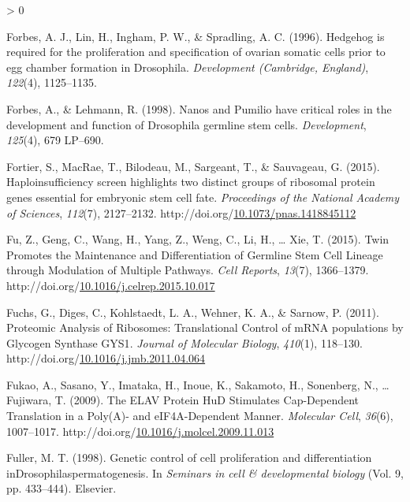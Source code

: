 \documentclass[12pt,oneside]{reedthesis}
\newlength{\cslhangindent}
\newenvironment{CSLReferences}[2] %
 {%
  \setlength{\parindent}{0pt}
  \ifodd #1 \everypar{\setlength{\hangindent}{\cslhangindent}}\ignorespaces\fi
  \ifnum #2 > 0
  \setlength{\parskip}{#2\baselineskip}
  \fi
 }%
 {}
\begin{document}
\begin{CSLReferences}{1}{0}
\leavevmode\hypertarget{ref-forbesHedgehogRequiredProliferation1996}{}%
Forbes, A. J., Lin, H., Ingham, P. W., \& Spradling, A. C. (1996). Hedgehog is required for the proliferation and specification of ovarian somatic cells prior to egg chamber formation in {Drosophila}. \emph{Development (Cambridge, England)}, \emph{122}(4), 1125--1135.

\leavevmode\hypertarget{ref-Forbes1998g}{}%
Forbes, A., \& Lehmann, R. (1998). Nanos and {Pumilio} have critical roles in the development and function of {Drosophila} germline stem cells. \emph{Development}, \emph{125}(4), 679 LP--690.

\leavevmode\hypertarget{ref-fortierHaploinsufficiencyScreenHighlights2015}{}%
Fortier, S., MacRae, T., Bilodeau, M., Sargeant, T., \& Sauvageau, G. (2015). Haploinsufficiency screen highlights two distinct groups of ribosomal protein genes essential for embryonic stem cell fate. \emph{Proceedings of the National Academy of Sciences}, \emph{112}(7), 2127--2132. http://doi.org/\href{https://doi.org/10.1073/pnas.1418845112}{10.1073/pnas.1418845112}

\leavevmode\hypertarget{ref-Fu2015h}{}%
Fu, Z., Geng, C., Wang, H., Yang, Z., Weng, C., Li, H., \ldots{} Xie, T. (2015). Twin {Promotes} the {Maintenance} and {Differentiation} of {Germline Stem Cell Lineage} through {Modulation} of {Multiple Pathways}. \emph{Cell Reports}, \emph{13}(7), 1366--1379. http://doi.org/\href{https://doi.org/10.1016/j.celrep.2015.10.017}{10.1016/j.celrep.2015.10.017}

\leavevmode\hypertarget{ref-fuchsProteomicAnalysisRibosomes2011}{}%
Fuchs, G., Diges, C., Kohlstaedt, L. A., Wehner, K. A., \& Sarnow, P. (2011). Proteomic {Analysis} of {Ribosomes}: {Translational Control} of {mRNA} populations by {Glycogen Synthase GYS1}. \emph{Journal of Molecular Biology}, \emph{410}(1), 118--130. http://doi.org/\href{https://doi.org/10.1016/j.jmb.2011.04.064}{10.1016/j.jmb.2011.04.064}

\leavevmode\hypertarget{ref-Fukao2009c}{}%
Fukao, A., Sasano, Y., Imataka, H., Inoue, K., Sakamoto, H., Sonenberg, N., \ldots{} Fujiwara, T. (2009). The {ELAV Protein HuD Stimulates Cap-Dependent Translation} in a {Poly}({A})- and {eIF4A-Dependent Manner}. \emph{Molecular Cell}, \emph{36}(6), 1007--1017. http://doi.org/\href{https://doi.org/10.1016/j.molcel.2009.11.013}{10.1016/j.molcel.2009.11.013}

\leavevmode\hypertarget{ref-Fuller1998c}{}%
Fuller, M. T. (1998). Genetic control of cell proliferation and differentiation {inDrosophilaspermatogenesis}. In \emph{Seminars in cell \& developmental biology} (Vol. 9, pp. 433--444). {Elsevier}.


\end{CSLReferences}
\end{document}
